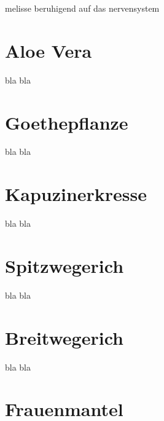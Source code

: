 melisse
beruhigend auf das nervensystem




\section{Aloe Vera}
\label{   }



bla bla



\section{Goethepflanze}
\label{   }



bla bla



\section{Kapuzinerkresse}
\label{   }



bla bla



\section{Spitzwegerich}
\label{   }



bla bla


\section{Breitwegerich}
\label{   }



bla bla


\section{Frauenmantel}
\label{   }


